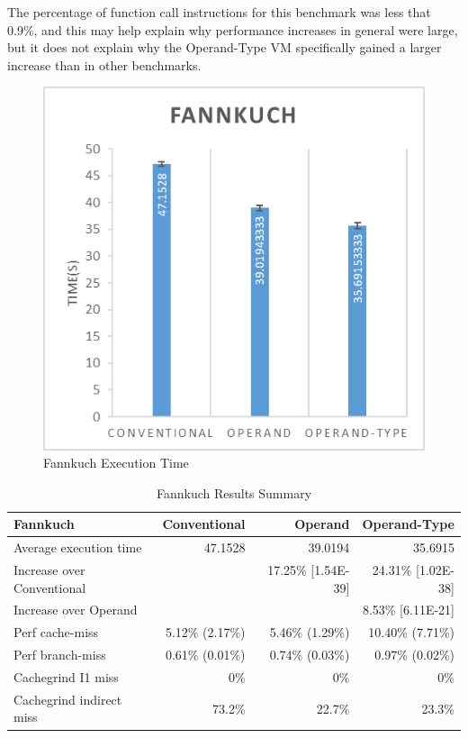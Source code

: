 \documentclass[english,a4paper,12pt]{report}
\begin{document}
The percentage of function call instructions for this benchmark was
less that 0.9\%, and this may help explain why performance increases
in general were large, but it does not explain why the Operand-Type VM
specifically gained a larger increase than in other benchmarks.

\begin{figure}[!htb]
  \centering
  \includegraphics{fannkuch.png}
  \caption{Fannkuch Execution Time}
  \label{fig:fannkuch-time}
\end{figure}

\begin{table}[!htb]
  \begin{center}
    \begin{tabular}{lrrr}
      Fannkuch & Conventional & Operand & Operand-Type\\
      \hline
      Average execution time & 47.1528 & 39.0194 & 35.6915\\
      Increase over Conventional &  & 17.25\% [1.54E-39] & 24.31\% [1.02E-38]\\
      Increase over Operand &  &  & 8.53\% [6.11E-21]\\
      Perf cache-miss & 5.12\% (2.17\%) & 5.46\% (1.29\%) & 10.40\% (7.71\%)\\
      Perf branch-miss & 0.61\% (0.01\%) & 0.74\% (0.03\%) & 0.97\% (0.02\%)\\
      Cachegrind I1 miss & 0\% & 0\% & 0\%\\
      Cachegrind indirect miss & 73.2\% & 22.7\% & 23.3\%\\
    \end{tabular}
  \end{center}
  \caption{Fannkuch Results Summary}
\end{table}
\end{document}
